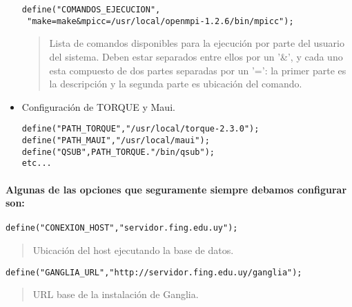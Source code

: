 \documentclass[a4paper,10pt,spanish]{article}
\begin{document}
\begin{itemize}
\begin{verbatim}
define("COMANDOS_EJECUCION",
 "make=make&mpicc=/usr/local/openmpi-1.2.6/bin/mpicc");
\end{verbatim}
\begin{quote}
Lista de comandos disponibles para la ejecuci\'{o}n por parte del usuario del sistema. Deben estar separados entre ellos por un '\&', y cada uno esta compuesto de dos partes separadas por un '=': la primer parte es la descripci\'{o}n y la segunda parte es ubicaci\'{o}n del comando.
\end{quote}

\item Configuraci\'{o}n de TORQUE y Maui.
\begin{verbatim}
define("PATH_TORQUE","/usr/local/torque-2.3.0");
define("PATH_MAUI","/usr/local/maui");
define("QSUB",PATH_TORQUE."/bin/qsub");
etc...
\end{verbatim}

\end{itemize}

\paragraph{Algunas de las opciones que seguramente siempre debamos configurar son:}
\begin{verbatim}
define("CONEXION_HOST","servidor.fing.edu.uy");
\end{verbatim}
\begin{quote}
Ubicaci\'{o}n del host ejecutando la base de datos.
\end{quote}
\begin{verbatim}
define("GANGLIA_URL","http://servidor.fing.edu.uy/ganglia");
\end{verbatim}
\begin{quote}
URL base de la instalaci\'{o}n de Ganglia.
\end{quote}
\end{document}
